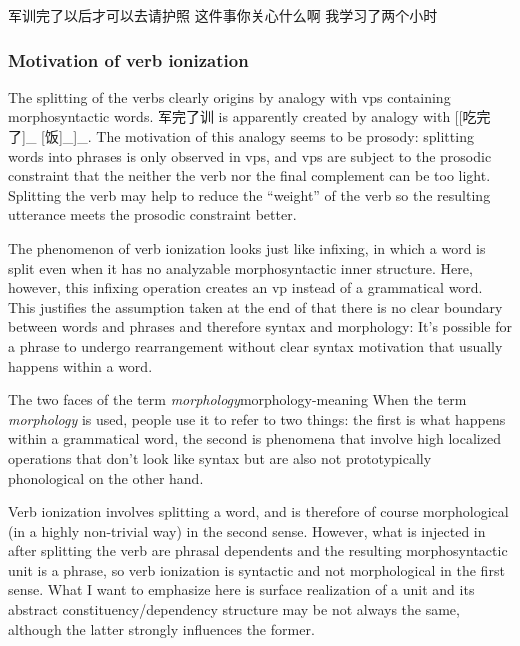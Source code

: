 \documentclass[UTF8, a4paper, oneside, scheme=plain]{ctexrep}
\newcommand*{\term}[1]{\emph{#1}}
\begin{document}
\begin{exe}
    \ex\label{ex:verb-phrase.separation.junxun-2} 军训完了以后才可以去请护照
    \ex\label{ex:verb-phrase.separation.guanxin-2} 这件事你关心什么啊
    \ex\label{ex:verb-phrase.separation.xuexi-2} 我学习了两个小时
\end{exe}

\subsubsection{Motivation of verb ionization}

The splitting of the verbs clearly origins 
by analogy with \ac{vp}s containing morphosyntactic words.
军完了训 is apparently created by analogy with 
[[吃完了]_{} [饭]_{}]_{}.
The motivation of this analogy seems to be prosody: 
splitting words into phrases is only observed in \ac{vp}s,
and \ac{vp}s are subject to the prosodic constraint 
that the neither the verb nor the final complement can be too light.
Splitting the verb may help to reduce the ``weight'' of the verb 
so the resulting utterance meets the prosodic constraint better.

The phenomenon of verb ionization
looks just like infixing,
in which a word is split even when it has no analyzable morphosyntactic inner structure.
Here, however, this infixing operation creates an \acs{vp} instead of a grammatical word.
This justifies the assumption taken at the end of 
that there is no clear boundary between words and phrases 
and therefore syntax and morphology:
It's possible for a phrase to undergo 
rearrangement without clear syntax motivation
that usually happens within a word.

\begin{theorybox}{The two faces of the term \term{morphology}}{morphology-meaning}
    When the term \term{morphology} is used, 
    people use it to refer to two things:
    the first is what happens within a grammatical word, 
    the second is phenomena that involve high localized
    operations that don't look like syntax 
    but are also not prototypically phonological on the other hand. 
    
    Verb ionization involves 
    splitting a word,
    and is therefore of course morphological (in a highly non-trivial way)
    in the second sense.
    However, what is injected in after splitting the verb are phrasal dependents 
    and the resulting morphosyntactic unit is a phrase,
    so verb ionization is syntactic and not morphological in the first sense.
    What I want to emphasize here is surface realization of a unit 
    and its abstract constituency/dependency structure
    may be not always the same, 
    although the latter strongly influences the former.
\end{theorybox}
\end{document}
